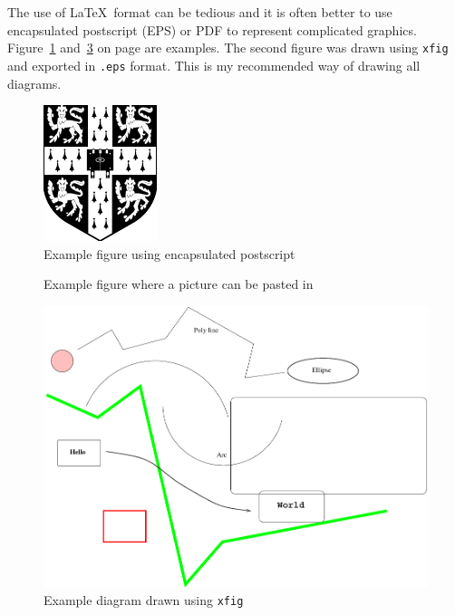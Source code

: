 The use of \LaTeX\ format can be tedious and it is often better to use
encapsulated postscript (EPS) or PDF to represent complicated graphics.
Figure~\ref{epsfig} and~\ref{xfig} on page \pageref{xfig} are
examples. The second figure was drawn using \texttt{xfig} and exported in
{\tt.eps} format. This is my recommended way of drawing all diagrams.


\begin{figure}[tbh]
\centerline{\includegraphics{figs/cuarms.pdf}}
\caption{Example figure using encapsulated postscript}
\label{epsfig}
\end{figure}

\begin{figure}[tbh]
\vspace{4in}
\caption{Example figure where a picture can be pasted in}
\label{pastedfig}
\end{figure}


\begin{figure}[tbh]
\centerline{\includegraphics{figs/diagram.pdf}}
\caption{Example diagram drawn using \texttt{xfig}}
\label{xfig}
\end{figure}
